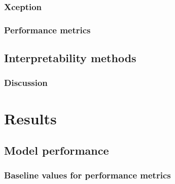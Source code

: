\documentclass[biblatexBackend=bibtex]{tumthesis}
\begin{document}
\subsection{Xception}
\label{sec:methodology:XC}


\subsection{Performance metrics}
\label{sec:methodology:metrics}


\section{Interpretability methods}
\label{sec:methodology:interpretability_methods}



\subsection{Discussion}
\label{sec:methodology:discussion}


\chapter{Results}
\label{ch:results}


\section{Model performance}
\label{sec:model_performance}


\subsection{Baseline values for performance metrics}
\label{sec:results:bl_values}

\end{document}

